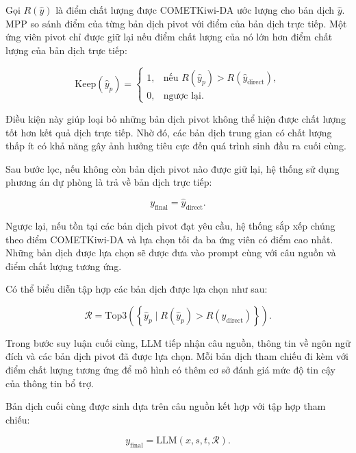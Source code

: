 Gọi $R(\hat{y})$ là điểm chất lượng được COMETKiwi-DA ước lượng cho bản dịch $\hat{y}$. MPP so sánh điểm của từng bản dịch pivot với điểm của bản dịch trực tiếp. Một ứng viên pivot chỉ được giữ lại nếu điểm chất lượng của nó lớn hơn điểm chất lượng của bản dịch trực tiếp:

\begin{equation}
	\mathrm{Keep}(\hat{y}_p)
	=
	\begin{cases}
		1, & \text{nếu } R(\hat{y}_p)>
		R(\hat{y}_{\mathrm{direct}}),\\
		0, & \text{ngược lại}.
	\end{cases}
	\label{eq:mpp-filter}
\end{equation}

Điều kiện này giúp loại bỏ những bản dịch pivot không thể hiện được chất lượng tốt hơn kết quả dịch trực tiếp. Nhờ đó, các bản dịch trung gian có chất lượng thấp ít có khả năng gây ảnh hưởng tiêu cực đến quá trình sinh đầu ra cuối cùng.

Sau bước lọc, nếu không còn bản dịch pivot nào được giữ lại, hệ thống sử dụng phương án dự phòng là trả về bản dịch trực tiếp:

\begin{equation}
	y_{\mathrm{final}}
	=
	\hat{y}_{\mathrm{direct}}.
\end{equation}

Ngược lại, nếu tồn tại các bản dịch pivot đạt yêu cầu, hệ thống sắp xếp chúng theo điểm COMETKiwi-DA và lựa chọn tối đa ba ứng viên có điểm cao nhất. Những bản dịch được lựa chọn sẽ được đưa vào prompt cùng với câu nguồn và điểm chất lượng tương ứng.

Có thể biểu diễn tập hợp các bản dịch được lựa chọn như sau:

\begin{equation}
	\mathcal{R}
	=
	\mathrm{Top3}
	\left(
	\left\{
	\hat{y}_p
	\mid
	R(\hat{y}_p)>
	R(\hat{y}_{\mathrm{direct}})
	\right\}
	\right).
\end{equation}

Trong bước suy luận cuối cùng, LLM tiếp nhận câu nguồn, thông tin về ngôn ngữ đích và các bản dịch pivot đã được lựa chọn. Mỗi bản dịch tham chiếu đi kèm với điểm chất lượng tương ứng để mô hình có thêm cơ sở đánh giá mức độ tin cậy của thông tin bổ trợ.

Bản dịch cuối cùng được sinh dựa trên câu nguồn kết hợp với tập hợp tham chiếu:

\begin{equation}
	y_{\mathrm{final}}
	=
	\mathrm{LLM}
	\left(
	x,s,t,\mathcal{R}
	\right).
\end{equation}

